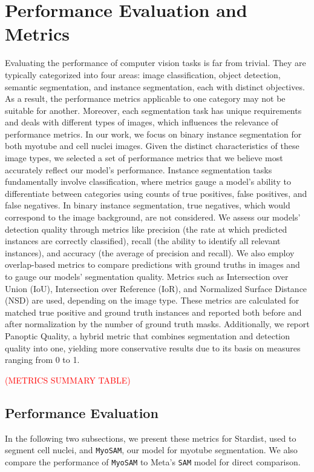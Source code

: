 \section{Performance Evaluation and Metrics}\label{secperformance}
Evaluating the performance of computer vision tasks is far from trivial. They are typically categorized into four areas: image classification, object detection, semantic segmentation, and instance segmentation, each with distinct objectives. As a result, the performance metrics applicable to one category may not be suitable for another. Moreover, each segmentation task has unique requirements and deals with different types of images, which influences the relevance of performance metrics. In our work, we focus on binary instance segmentation for both myotube and cell nuclei images. Given the distinct characteristics of these image types, we selected a set of performance metrics that we believe most accurately reflect our model's performance.
Instance segmentation tasks fundamentally involve classification, where metrics gauge a model's ability to differentiate between categories using counts of true positives, false positives, and false negatives. In binary instance segmentation, true negatives, which would correspond to the image background, are not considered. We assess our models' detection quality through metrics like precision (the rate at which predicted instances are correctly classified), recall (the ability to identify all relevant instances), and accuracy (the average of precision and recall). We also employ overlap-based metrics to compare predictions with ground truths in images and to gauge our models' segmentation quality. Metrics such as Intersection over Union (IoU), Intersection over Reference (IoR), and Normalized Surface Distance (NSD) are used, depending on the image type. These metrics are calculated for matched true positive and ground truth instances and reported both before and after normalization by the number of ground truth masks. Additionally, we report Panoptic Quality, a hybrid metric that combines segmentation and detection quality into one, yielding more conservative results due to its basis on measures ranging from 0 to 1.

\textcolor{red}{(METRICS SUMMARY TABLE)}
\subsection{Performance Evaluation}
In the following two subsections, we present these metrics for Stardist, used to segment cell nuclei, and \texttt{MyoSAM}, our model for myotube segmentation. We also compare the performance of \texttt{MyoSAM} to Meta’s \texttt{SAM} model for direct comparison.
